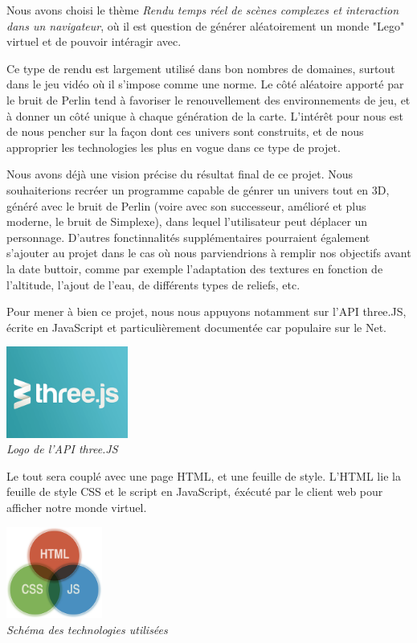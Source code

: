 Nous avons choisi le thème \textit{Rendu temps réel de scènes complexes et interaction dans un navigateur}, où il est question de générer aléatoirement un monde "Lego" virtuel et de pouvoir intéragir avec. 

Ce type de rendu est largement utilisé dans bon nombres de domaines, surtout dans le jeu vidéo où il s'impose comme une norme. Le côté aléatoire apporté par le bruit de Perlin tend à favoriser le renouvellement des environnements de jeu, et à donner un côté unique à chaque génération de la carte. L'intérêt pour nous est de nous pencher sur la façon dont ces univers sont construits, et de nous approprier les technologies les plus en vogue dans ce type de projet.

Nous avons déjà une vision précise du résultat final de ce projet. Nous souhaiterions recréer un programme capable de génrer un univers tout en 3D, généré avec le bruit de Perlin (voire avec son successeur, amélioré et plus moderne, le bruit de Simplexe), dans lequel l'utilisateur peut déplacer un personnage. D'autres fonctinnalités supplémentaires pourraient également s'ajouter au projet dans le cas où nous parviendrions à remplir nos objectifs avant la date buttoir, comme par exemple l'adaptation des textures en fonction de l'altitude, l'ajout de l'eau, de différents types de reliefs, etc. 

Pour mener à bien ce projet, nous nous appuyons notamment sur l'API three.JS, écrite en JavaScript et particulièrement documentée car populaire sur le Net.

\begin{center}
	\null\vspace{0.25cm}
	\includegraphics[height=3cm]{images/logo_threeJS.png}\\
	\textit{Logo de l'API three.JS}\\
\end{center}

Le tout sera couplé avec une page HTML, et une feuille de style. L'HTML lie la feuille de style CSS et le script en JavaScript, éxécuté par le client web pour afficher notre monde virtuel.


\begin{center}
	\null\vspace{0.25cm}
	\includegraphics[height=3cm]{images/HTML_CSS_JS.png}\\
	\textit{Schéma des technologies utilisées}\\
\end{center}

